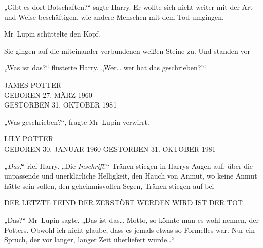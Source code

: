 „Gibt es dort Botschaften?“ sagte Harry. Er wollte sich nicht weiter mit der Art und Weise beschäftigen, wie andere Menschen mit dem Tod umgingen.

Mr~Lupin schüttelte den Kopf.


Sie gingen auf die miteinander verbundenen weißen Steine zu. Und standen vor—

„Was ist das?“ flüsterte Harry. „Wer… wer hat das geschrieben?!“

\begin{center}
JAMES POTTER\\
GEBOREN 27. MÄRZ 1960\\
GESTORBEN 31. OKTOBER 1981
\end{center}

„Was geschrieben?“, fragte Mr~Lupin verwirrt.

\begin{center}
LILY POTTER\\
GEBOREN 30. JANUAR 1960
GESTORBEN 31. OKTOBER 1981
\end{center}

\emph{„Das!}“ rief Harry. „Die \emph{Inschrift}!“
Tränen stiegen in Harrys Augen auf, über die unpassende und unerklärliche Helligkeit, den Hauch von Anmut, wo keine Anmut hätte sein sollen, den geheimnisvollen Segen, Tränen stiegen auf bei

\begin{center}
DER LETZTE FEIND DER ZERSTÖRT WERDEN WIRD IST DER TOT
\end{center}

„Das?“ Mr~Lupin sagte. „Das ist das… Motto, so könnte man es wohl nennen, der Potters. Obwohl ich nicht glaube, dass es jemals etwas so Formelles war. Nur ein Spruch, der vor langer, langer Zeit überliefert wurde…“

